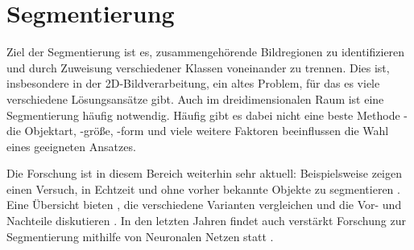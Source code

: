 \section{Segmentierung}
\label{sec:segmentation}

Ziel der Segmentierung ist es, zusammengehörende Bildregionen zu identifizieren und durch Zuweisung verschiedener Klassen voneinander zu trennen.
Dies ist, insbesondere in der 2D-Bildverarbeitung, ein altes Problem, für das es viele verschiedene Lösungsansätze gibt.
Auch im dreidimensionalen Raum ist eine Segmentierung häufig notwendig.
Häufig gibt es dabei nicht eine beste Methode - die Objektart, -größe, -form und viele weitere Faktoren beeinflussen die Wahl eines geeigneten Ansatzes.

Die Forschung ist in diesem Bereich weiterhin sehr aktuell:
Beispielsweise zeigen \citeauthor{uckermann2012real} einen Versuch, in Echtzeit und ohne vorher bekannte Objekte zu segmentieren \cite{uckermann2012real}.
Eine Übersicht bieten \citeauthor{nguyen20133d}, die verschiedene Varianten vergleichen und die Vor- und Nachteile diskutieren \cite{nguyen20133d}.
In den letzten Jahren findet auch verstärkt Forschung zur Segmentierung mithilfe von Neuronalen Netzen statt \cite{te2018rgcnn}.